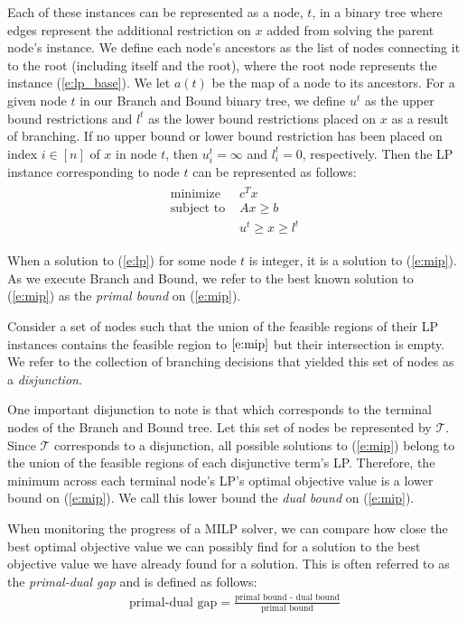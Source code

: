 \documentclass[10pt]{article}
\begin{document}
	Each of these instances can be represented as a node, $ t $, in a binary tree where edges represent the additional restriction on $ x $ added from solving the parent node's instance. We define each node's ancestors as the list of nodes connecting it to the root (including itself and the root), where the root node represents the instance (\ref{e:lp_base}). We let $ a(t) $ be the map of a node to its ancestors. For a given node $ t $ in our Branch and Bound binary tree, we define $ u^t $ as the upper bound restrictions and $ l^t $ as the lower bound restrictions placed on $ x $ as a result of branching. If no upper bound or lower bound restriction has been placed on index $ i \in [n] $ of $ x $ in node $ t $, then $ u_i^t = \infty $ and $ l_i^t = 0 $, respectively. Then the LP instance corresponding to node $ t $ can be represented as follows:
	\begin{align}
		\begin{split}
			\text{minimize } & c^T x \\
			\text{subject to } & Ax \geq b \\
			& u^t \geq x \geq l^t
		\end{split} \label{e:lp}
	\end{align}
	
	When a solution to (\ref{e:lp}) for some node $ t $ is integer, it is a solution to (\ref{e:mip}). As we execute Branch and Bound, we refer to the best known solution to (\ref{e:mip}) as the \textit{primal bound} on (\ref{e:mip}).
	
	Consider a set of nodes such that the union of the feasible regions of their LP instances contains the feasible region to $ \ref{e:mip} $ but their intersection is empty. We refer to the collection of branching decisions that yielded this set of nodes as a \textit{disjunction}.
	
	One important disjunction to note is that which corresponds to the terminal nodes of the Branch and Bound tree. Let this set of nodes be represented by $ \mathcal{T} $. Since $ \mathcal{T} $ corresponds to a disjunction, all possible solutions to (\ref{e:mip}) belong to the union of the feasible regions of each disjunctive term's LP. Therefore, the minimum across each terminal node's LP's optimal objective value is a lower bound on (\ref{e:mip}). We call this lower bound the \textit{dual bound} on (\ref{e:mip}).
	
	When monitoring the progress of a MILP solver, we can compare how close the best optimal objective value we can possibly find for a solution to the best objective value we have already found for a solution. This is often referred to as the \textit{primal-dual gap} and is defined as follows:
	\begin{align}
		\text{primal-dual gap} = \frac{\text{primal bound - dual bound}}{\text{primal bound}} \label{e:mip_gap}
	\end{align}
	
\end{document}
